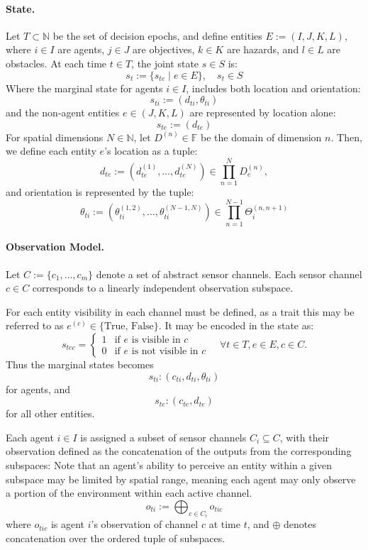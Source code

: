\documentclass{article}
\begin{document}
\paragraph{State.} 
Let \(T \subset \mathbb{N}\) be the set of decision epochs, 
and define entities \(E := (I, J, K, L)\), where 
\(i \in I\) are agents, 
\(j \in J\) are objectives, 
\(k \in K\) are hazards, and 
\(l \in L\) are obstacles. 
At each time \(t \in T\), the joint state \(s\in S\) is:
\[
    s_t := \{s_{te} \mid e \in E\}, \quad s_t \in S
\]
Where the marginal state for agents \(i \in I\), 
includes both location and orientation:
\[
    s_{ti} := (d_{ti}, \theta_{ti})
\]
and the non-agent entities \(e \in (J, K, L)\) are represented by location alone:
\[
    s_{te} := (d_{te})
\]
For spatial dimensions \(N \in \mathbb{N}\), 
let \(D^{(n)} \in \mathbb{F}\) be the domain of dimension \(n\).
Then, we define each entity \(e\)'s location as a tuple:
\[
    d_{te} := \left(d_{te}^{(1)},\ldots,d_{te}^{(N)}\right) \in \prod_{n=1}^N D_e^{(n)},
\]
and orientation is represented by the tuple:
\[
    \theta_{ti} := \left(\theta_{ti}^{(1,2)},\ldots,\theta_{ti}^{(N-1,N)}\right)
    \in \prod_{n=1}^{N-1} \Theta_i^{(n,n+1)}
\]

\paragraph{Observation Model.}
Let \({C} := \{c_1, \ldots, c_m\}\) denote a set of abstract sensor channels.
Each sensor channel \(c \in {C}\) corresponds to a linearly 
independent observation subspace.

For each entity visibility in each channel must be defined,
as a trait this may be referred to as \(e^{(c)} \in \{\text{True, False}\}\).
It may be encoded in the state as:
\[
s_{tec} = 
\begin{cases}
    1& \text{if \(e\) is visible in \(c\)} \\ 
    0& \text{if \(e\) is not visible in \(c\)}
\end{cases} 
\quad\forall t\in T, e\in E, c\in C.
\]
Thus the marginal states becomes
\[s_{ti} :(c_{ti},d_{ti},\theta_{ti})\]
for agents, and
\[s_{te} :(c_{te},d_{te})\]
for all other entities.

Each agent \(i \in I\) is assigned a subset of sensor channels 
\({C}_i \subseteq {C}\), 
with their observation defined as the concatenation of the outputs 
from the corresponding subspaces:
Note that an agent's ability to perceive an entity within a given 
subspace may be limited by spatial range, meaning each agent may 
only observe a portion of the environment within each active channel.
\[
    o_{ti} := \bigoplus_{c \in {C}_i} o_{tic}
\]
where \(o_{tic}\) is agent \(i\)'s observation of channel \(c\) at time \(t\), 
and \(\oplus\) denotes concatenation over the ordered tuple of subspaces.
\end{document}
